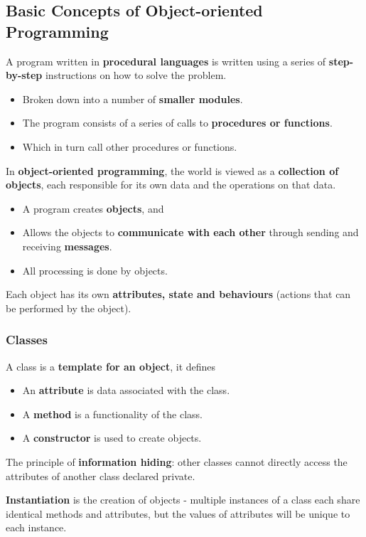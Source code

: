 \subsection{Basic Concepts of Object-oriented Programming}

A program written in \textbf{procedural languages} is written using a series of \textbf{step-by-step} instructions on how to solve the problem.
\begin{itemize}
    \item Broken down into a number of \textbf{smaller modules}.
    \item The program consists of a series of calls to \textbf{procedures or functions}.
    \item Which in turn call other procedures or functions.
\end{itemize}

In \textbf{object-oriented programming}, the world is viewed as a \textbf{collection of objects}, each responsible for its own data and the operations on that data.
\begin{itemize}
    \item A program creates \textbf{objects}, and
    \item Allows the objects to \textbf{communicate with each other} through sending and receiving \textbf{messages}.
    \item All processing is done by objects.
\end{itemize}

Each object has its own \textbf{attributes, state and behaviours} (actions that can be performed by the object).

\subsubsection*{Classes}

A class is a \textbf{template for an object}, it defines
\begin{itemize}
    \item An \textbf{attribute} is data associated with the class.
    \item A \textbf{method} is a functionality of the class.
    \item A \textbf{constructor} is used to create objects.
\end{itemize}
The principle of \textbf{information hiding}: other classes cannot directly access the attributes of another class declared private.

\textbf{Instantiation} is the creation of objects - multiple instances of a class each share identical methods and attributes, but the values of attributes will be unique to each instance.

